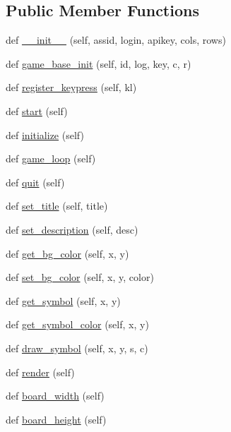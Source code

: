 \subsection*{Public Member Functions}
\begin{DoxyCompactItemize}
\item 
def \mbox{\hyperlink{classbridges_1_1gamebase_1_1_game_base_a869c20436a432429580f1a4e5fb63b9e}{\+\_\+\+\_\+init\+\_\+\+\_\+}} (self, assid, login, apikey, cols, rows)
\item 
def \mbox{\hyperlink{classbridges_1_1gamebase_1_1_game_base_ad0d97def82fd9c51fd7beed609663d50}{game\+\_\+base\+\_\+init}} (self, id, log, key, c, r)
\item 
def \mbox{\hyperlink{classbridges_1_1gamebase_1_1_game_base_ac60243e192a502fb7be51f86eb5b76b6}{register\+\_\+keypress}} (self, kl)
\item 
def \mbox{\hyperlink{classbridges_1_1gamebase_1_1_game_base_a05a30fccf88c2baba1137b5a06ba2ed7}{start}} (self)
\item 
def \mbox{\hyperlink{classbridges_1_1gamebase_1_1_game_base_a336629d190f1601f1211ca57e4d5427d}{initialize}} (self)
\item 
def \mbox{\hyperlink{classbridges_1_1gamebase_1_1_game_base_af650eeb756558d2cbcae43c74de5cce7}{game\+\_\+loop}} (self)
\item 
def \mbox{\hyperlink{classbridges_1_1gamebase_1_1_game_base_a21742d4e630fa64dc76848c7b4fcb344}{quit}} (self)
\item 
def \mbox{\hyperlink{classbridges_1_1gamebase_1_1_game_base_a7e7d4033c4b191b3699dbf0cb5f25933}{set\+\_\+title}} (self, title)
\item 
def \mbox{\hyperlink{classbridges_1_1gamebase_1_1_game_base_a75ecd56daf08036207772d6ce81c90b1}{set\+\_\+description}} (self, desc)
\item 
def \mbox{\hyperlink{classbridges_1_1gamebase_1_1_game_base_a64e8828adb940ee2c00025b1f0816b63}{get\+\_\+bg\+\_\+color}} (self, x, y)
\item 
def \mbox{\hyperlink{classbridges_1_1gamebase_1_1_game_base_ae6ab09a24237c774b709c0b9dc4a5a45}{set\+\_\+bg\+\_\+color}} (self, x, y, color)
\item 
def \mbox{\hyperlink{classbridges_1_1gamebase_1_1_game_base_a27492d9f765d7ab6d4468b731f7e1744}{get\+\_\+symbol}} (self, x, y)
\item 
def \mbox{\hyperlink{classbridges_1_1gamebase_1_1_game_base_a73ec315b9239907cc7c1f1e1fd5c312e}{get\+\_\+symbol\+\_\+color}} (self, x, y)
\item 
def \mbox{\hyperlink{classbridges_1_1gamebase_1_1_game_base_aaeba94a7c5a58a305284976b015ed17e}{draw\+\_\+symbol}} (self, x, y, s, c)
\item 
def \mbox{\hyperlink{classbridges_1_1gamebase_1_1_game_base_a3ae3bcb9702097029509d4123bc9276e}{render}} (self)
\item 
def \mbox{\hyperlink{classbridges_1_1gamebase_1_1_game_base_a46a635c075e1a0a651e4caa18369494d}{board\+\_\+width}} (self)
\item 
def \mbox{\hyperlink{classbridges_1_1gamebase_1_1_game_base_ad1595582d3b02aa4225efed3beab935f}{board\+\_\+height}} (self)
\end{DoxyCompactItemize}
